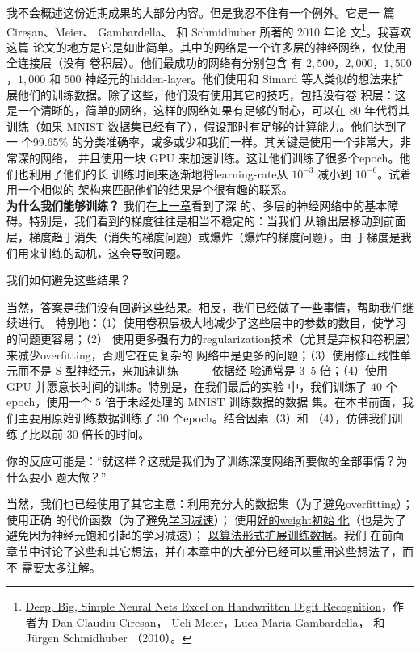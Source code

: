 我不会概述这份近期成果的大部分内容。但是我忍不住有一个例外。它是一
篇 Cireșan、Meier、 Gambardella、 和 Schmidhuber 所著的 2010 年论
文\footnote{\href{http://arxiv.org/abs/1003.0358}{Deep, Big, Simple Neural Nets
    Excel on Handwritten Digit Recognition}，作者为 Dan Claudiu Cireșan， Ueli
  Meier，Luca Maria Gambardella， 和 Jürgen Schmidhuber （2010）。}。我喜欢这篇
论文的地方是它是如此简单。其中的网络是一个许多层的神经网络，仅使用全连接层（没有
卷积层）。他们最成功的网络有分别包含
有 $2,500$，$2,000$，$1,500$，$1,000$ 和 $500$ 神经元的\gls*{hidden-layer}。他们使用和 Simard
等人类似的想法来扩展他们的训练数据。除了这些，他们没有使用其它的技巧，包括没有卷
积层：这是一个清晰的，简单的网络，这样的网络如果有足够的耐心，可以在 80 年代将其
训练（如果 MNIST 数据集已经有了），假设那时有足够的计算能力。他们达到了一
个99.65\% 的分类准确率，或多或少和我们一样。其关键是使用一个非常大，非常深的网络，
并且使用一块 GPU 来加速训练。这让他们训练了很多个\gls*{epoch}。他们也利用了他们的长
训练时间来逐渐地将\gls*{learning-rate}从 $10^{-3}$ 减小到 $10^{-6}$。试着用一个相似的
架构来匹配他们的结果是个很有趣的联系。\\

\textbf{为什么我们能够训练？} 我们在\hyperref[ch:WhyHardToTrain]{上一章}看到了深
的、多层的神经网络中的基本障碍。特别是，我们看到的梯度往往是相当不稳定的：当我们
从输出层移动到前面层，梯度趋于消失（消失的梯度问题）或爆炸（爆炸的梯度问题）。由
于梯度是我们用来训练的动机，这会导致问题。

我们如何避免这些结果？

当然，答案是我们没有回避这些结果。相反，我们已经做了一些事情，帮助我们继续进行。
特别地：（1）使用卷积层极大地减少了这些层中的参数的数目，使学习的问题更容易；（2）
使用更多强有力的\gls*{regularization}技术（尤其是弃权和卷积层）来减少\gls*{overfitting}，否则它在更复杂的
网络中是更多的问题；（3）使用修正线性单元而不是 S 型神经元，来加速训练~——~依据经
验通常是 $3$--$5$ 倍；（4）使用 GPU 并愿意长时间的训练。特别是，在我们最后的实验
中，我们训练了 $40$ 个\gls*{epoch}，使用一个 $5$ 倍于未经处理的 MNIST 训练数据的数据
集。在本书前面，我们主要用原始训练数据训练了 $30$ 个\gls*{epoch}。结合因素（3）和
（4），仿佛我们训练了比以前 $30$ 倍长的时间。

你的反应可能是：“就这样？这就是我们为了训练深度网络所要做的全部事情？为什么要小
题大做？”

当然，我们也已经使用了其它主意：利用充分大的数据集（为了避免\gls*{overfitting}）；使用正确
的代价函数（为了避免\hyperref[sec:the_cross-entropy_cost_function]{学习减速}）；
使用\hyperref[sec:how_to_choose_a_neural_network's_hyper-parameters]{好的\gls*{weight}初始
  化}（也是为了避免因为神经元饱和引起的学习减速）；%
\hyperref[sec:other_techniques_for_regularization]{以算法形式扩展训练数据}。我们
在前面章节中讨论了这些和其它想法，并在本章中的大部分已经可以重用这些想法了，而不
需要太多注解。

